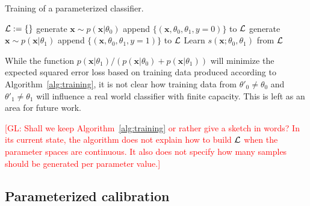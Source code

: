 \documentclass[12pt]{article}
\numberwithin{equation}{section}
\theoremstyle{plain}
\newcommand{\glnote}[1]{\textcolor{red}{[GL: #1]}}
\begin{document}
\begin{algorithm}[t]
\caption{Training of a parameterized classifier.}\label{alg:training}
    \begin{algorithmic}
        \State ${\cal L := \{ \}}$
        		\State generate $\mathbf{x} \sim p(\mathbf{x}|\theta_0)$
        		\State append $\{ (\mathbf{x}, \theta_0, \theta_1, y=0) \}$ to ${\cal L}$
        		\State generate $\mathbf{x} \sim p(\mathbf{x}|\theta_1)$
        		\State append $\{ (\mathbf{x}, \theta_0, \theta_1, y=1) \}$ to ${\cal L}$
        	\EndFor
        \EndFor
        \State Learn $s(\mathbf{x}; \theta_0, \theta_1)$ from ${\cal L}$
    \end{algorithmic}
\end{algorithm}

While the function
$p(\mathbf{x}|\theta_1)/(p(\mathbf{x}|\theta_0)+p(\mathbf{x}|\theta_1))$ will
minimize the expected squared error loss based on training data produced
according to Algorithm~\ref{alg:training}, it is not clear how training data
from $\theta'_0 \ne \theta_0$ and $\theta'_1 \ne \theta_1$ will influence a real
world classifier with finite capacity. This is left as an area for future work.

\glnote{Shall we keep Algorithm~\ref{alg:training} or rather give a sketch in
words? In its current state, the algorithm does not explain how to build ${\cal
L}$ when the parameter spaces are continuous. It also does not specify how many
samples should be generated per parameter value.}

\subsection{Parameterized calibration}
\end{document}
